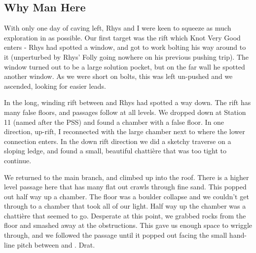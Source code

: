 
 \subsection{Why Man Here}
 
 
 


With only one day of caving left, Rhys and I were keen to squeeze as much exploration in as possible. Our first target was the rift which Knot Very Good enters - Rhys had spotted a window, and got to work bolting his way around to it (unperturbed by Rhys’ Folly going nowhere on his previous pushing trip). The window turned out to be a large solution pocket, but on the far wall he spotted another window. As we were short on bolts, this was left un-pushed and we ascended, looking for easier leads.


 
In the long, winding rift between  and  Rhys had spotted a way down. The rift has many false floors, and passages follow at all levels. We dropped down at Station 11 (named after the PSS) and found a chamber with a false floor. In one direction, up-rift, I reconnected with the large chamber next to  where the lower  connection enters. In the down rift direction we did a sketchy traverse on a sloping ledge, and found a small, beautiful chattière that was too tight to continue.
 
We returned to the main branch, and climbed up into the roof. There is a higher level passage here that has many flat out crawls through fine sand. This popped out half way up a chamber. The floor was a boulder collapse and we couldn’t get through to a chamber that took all of our light. Half way up the chamber was a chattière that seemed to go. Desperate at this point, we grabbed rocks from the floor and smashed away at the obstructions. This gave us enough space to wriggle through, and we followed the passage until it popped out facing the small hand-line pitch between  and . Drat.
 
  \begin{marginfigure}
 \end{marginfigure}
 
